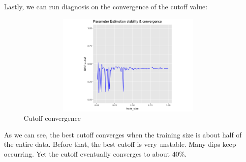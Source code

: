 \documentclass[jou]{apa}%
\begin{document}
Lastly, we can run diagnosis on the convergence of the cutoff value: 
\begin{figure}[H]\hspace*{-1.5cm}\centering\includegraphics[width=12cm, height = 5cm]{convergeCutoff}\caption{Cutoff convergence}\end{figure}
As we can see, the best cutoff converges when the training size is about half of the entire data. Before that, the best cutoff is very unstable. Many dips keep occurring. Yet the cutoff eventually converges to about 40\%. 
\end{document}
